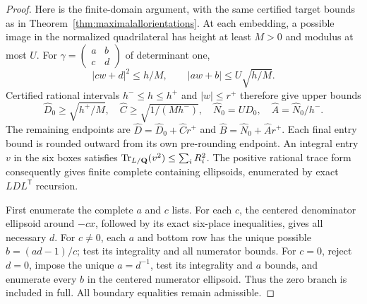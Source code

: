 \begin{proof}
Here is the finite-domain argument, with the same certified target
bounds as in Theorem~\ref{thm:maximalallorientations}.
At each embedding, a possible image in the normalized quadrilateral
has height at least $M>0$ and modulus at most $U$.
For $\gamma=\left(\begin{smallmatrix}a&b\\c&d\end{smallmatrix}\right)$
of determinant one,
\[
 |cw+d|^2\le h/M,\qquad |aw+b|\le U\sqrt{h/M}.
\]
Certified rational intervals $h^-\le h\le h^+$ and $|w|\le r^+$
therefore give upper bounds
\[
 \widehat D_0\ge\sqrt{h^+/M},\quad
 \widehat C\ge\sqrt{1/(Mh^-)},\quad
 \widehat N_0=U\widehat D_0,\quad
 \widehat A=\widehat N_0/h^-.
\]
The remaining endpoints are
$\widehat D=\widehat D_0+\widehat C r^+$ and
$\widehat B=\widehat N_0+\widehat A r^+$.
Each final entry bound is rounded outward from its own pre-rounding
endpoint.  An integral entry $v$ in the six boxes satisfies
$\operatorname{Tr}_{L/\mathbf Q}(v^2)\le\sum_i R_i^2$.
The positive rational trace form consequently gives finite complete
containing ellipsoids, enumerated by exact $LDL^{\mathsf T}$ recursion.

First enumerate the complete $a$ and $c$ lists.  For each $c$, the
centered denominator ellipsoid around $-cx$, followed by its exact
six-place inequalities, gives all necessary $d$.
For $c\ne0$, each $a$ and bottom row has the unique possible
$b=(ad-1)/c$; test its integrality and all numerator bounds.
For $c=0$, reject $d=0$, impose the unique $a=d^{-1}$, test its
integrality and $a$ bounds, and enumerate every $b$ in the centered
numerator ellipsoid.  Thus the zero branch is included in full.
All boundary equalities remain admissible.


\end{proof}
